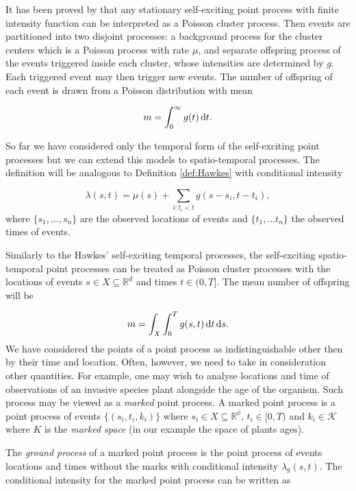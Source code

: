 It has been proved by \cite{Hawkes74} that any stationary self-exciting point process with finite intensity function can be interpreted as a Poisson cluster process. Then events are partitioned into two disjoint processes: a background process for the cluster centers which is a Poisson process with rate $\mu$, and separate offspring process of the events triggered inside each cluster, whose intensities are determined by $g$. Each triggered event may then trigger new events. The number of offspring of each event is drawn from a Poisson distribution with mean 

\begin{equation*}
    m = \int_0^\infty g(t) \operatorname{d}\!{t}.
\end{equation*}

So far we have considered only the temporal form of the self-exciting point processes but we can extend this models to spatio-temporal processes. The definition will be analogous to Definition \ref{def:Hawkes} with conditional intensity

\begin{equation*}
    \lambda(s, t) = \mu(s) + \sum_{i:t_i<t} g(s - s_i, t - t_i),
\end{equation*}
where $\{ s_1, \dots, s_n \}$ are the observed locations of events and $\{t_1, \dots t_n \}$ the observed times of events. 

Similarly to the Hawkes' self-exciting temporal processes, the self-exciting spatio-temporal point processes can be treated as Poisson cluster processes with the locations of events $s \in X \subseteq \mathbb{R}^d$ and times $t \in (0, T]$. The mean number of offspring will be

\begin{equation}\label{eq:meanoffsp}
    m = \int_X \int_0^T g(s, t) \operatorname{d}\!{t} \operatorname{d}\!{s}.
\end{equation}
We have considered the points of a point process as indistinguishable other then by their time and location. Often, however, we need to take in consideration other quantities. For example, one may wish to analyse locations and time of observations of an invasive species plant alongside the age of the organism. Such process may be viewed as a \textit{marked} point process. A marked point process is a point process of events $\{ (s_i, t_i, k_i ) \}$ where  $s_i \in X \subseteq \mathbb{R^d}$, $t_i \in [0, T)$ and $k_i \in \mathcal{K}$ where $K$ is the \textit{marked space} (in our example the space of plants ages).

The \textit{ground process} of a marked point process is the point process of events locations and times without the marks with conditional intensity $\lambda_g(s, t)$. The conditional intensity for the marked point process can be written as

